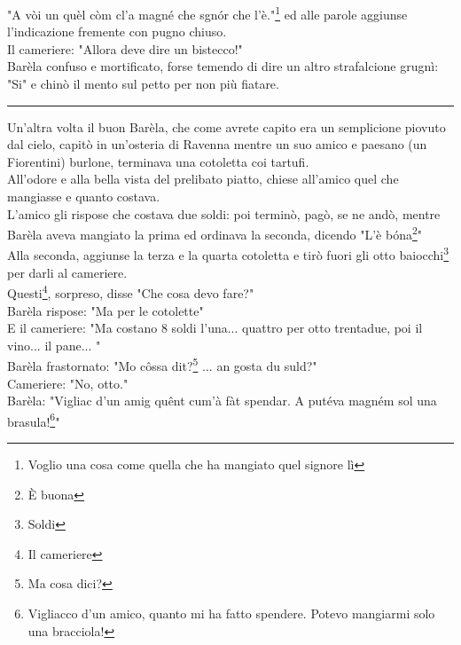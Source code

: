 \documentclass[10pt]{memoir} %
\begin{document}
"A vòi un quèl còm cl'a magné che sgnór che l'è."\footnote{Voglio una cosa come quella che ha mangiato quel signore lì} ed alle parole aggiunse l'indicazione fremente con pugno chiuso.\\
Il cameriere: "Allora deve dire un bistecco!"\\
Barèla confuso e mortificato, forse temendo di dire un altro strafalcione grugnì: "Si" e chinò il mento sul petto per non più fiatare.
\begin{center}
\rule{1.5cm}{0.4pt}
\end{center}
Un'altra volta il buon Barèla, che come avrete capito era un semplicione piovuto dal cielo, capitò in un'osteria di Ravenna mentre un suo amico e paesano (un Fiorentini) burlone, terminava una cotoletta coi tartufi.\\
All'odore e alla bella vista del prelibato piatto, chiese all'amico quel che mangiasse e quanto costava.\\
L'amico gli rispose che costava due soldi: poi terminò, pagò, se ne andò, mentre Barèla aveva mangiato la prima ed ordinava la seconda, dicendo "L'è bóna\footnote{È buona}"\\
Alla seconda, aggiunse la terza e la quarta cotoletta e tirò fuori gli otto baiocchi\footnote{Soldi} per darli al cameriere.\\
Questi\footnote{Il cameriere}, sorpreso, disse "Che cosa devo fare?"\\
Barèla rispose: "Ma per le cotolette"\\
E il cameriere: "Ma costano 8 soldi l'una... quattro per otto trentadue, poi il vino... il pane... "\\
Barèla frastornato: "Mo côssa dit?\footnote{Ma cosa dici?} ... an gosta du suld?"\\
Cameriere: "No, otto."\\
Barèla: "Vigliac d'un amig quênt cum'à fàt spendar. A putéva magném sol una brasula!\footnote{Vigliacco d'un amico, quanto mi ha fatto spendere. Potevo mangiarmi solo una bracciola!}" 

\end{document}
